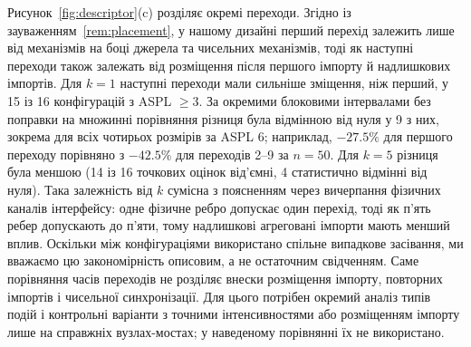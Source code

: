 \documentclass[a4paper,fleqn]{cas-sc}
\begin{document}
Рисунок~\ref{fig:descriptor}(c) розділяє окремі переходи. Згідно із зауваженням~\ref{rem:placement}, у нашому дизайні перший перехід залежить лише від механізмів на боці джерела та чисельних механізмів, тоді як наступні переходи також залежать від розміщення після першого імпорту й надлишкових імпортів. Для $k=1$ наступні переходи мали сильніше зміщення, ніж перший, у 15 із 16 конфігурацій з ASPL $\ge3$. За окремими блоковими інтервалами без поправки на множинні порівняння різниця була відмінною від нуля у 9 з них, зокрема для всіх чотирьох розмірів за ASPL 6; наприклад, $-27.5\%$ для першого переходу порівняно з $-42.5\%$ для переходів 2--9 за $n=50$. Для $k=5$ різниця була меншою (14 із 16 точкових оцінок від'ємні, 4 статистично відмінні від нуля). Така залежність від $k$ сумісна з поясненням через вичерпання фізичних каналів інтерфейсу: одне фізичне ребро допускає один перехід, тоді як п'ять ребер допускають до п'яти, тому надлишкові агреговані імпорти мають менший вплив. Оскільки між конфігураціями використано спільне випадкове засівання, ми вважаємо цю закономірність описовим, а не остаточним свідченням. Саме порівняння часів переходів не розділяє внески розміщення імпорту, повторних імпортів і чисельної синхронізації. Для цього потрібен окремий аналіз типів подій і контрольні варіанти з точними інтенсивностями або розміщенням імпорту лише на справжніх вузлах-мостах; у наведеному порівнянні їх не використано.

\clearpage



\end{document}
